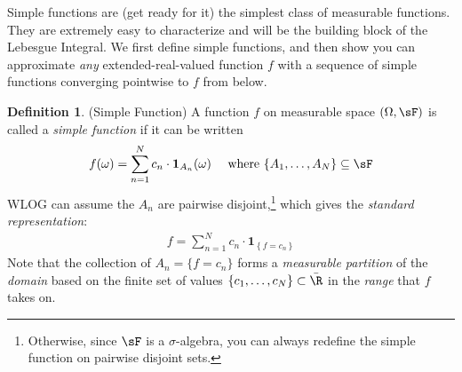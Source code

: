 \documentclass[12pt]{article}
\theoremstyle{plain}
\theoremstyle{definition}
\newtheorem{defn}[thm]{Definition}
\theoremstyle{remark}
\newtheorem*{rmk}{Remark}
\newcommand*{\Chi}{\mbox{\large$\chi$}} %
\newcommand{\one}[1]{\mathbf{1}_{#1}}
\begin{document}
Simple functions are (get ready for it) the simplest class of measurable
functions. They are extremely easy to characterize and will be the
building block of the Lebesgue Integral. We first define simple
functions, and then show you can approximate \emph{any}
extended-real-valued function $f$ with a sequence of simple functions
converging pointwise to $f$ from below.

\begin{defn}(Simple Function)
A function $f$ on measurable space $(\Omega,\sF)$ is called a
\emph{simple function} if it can be written
\begin{equation}
  \label{simplefn}
  f(\omega) = \sum^N_{n=1} c_n \cdot \one{A_n}(\omega)
  \quad
  \text{ where }
  \{A_1, \ldots, A_N\}\subseteq\sF
\end{equation}
WLOG can assume the $A_n$ are pairwise disjoint,\footnote{%
  Otherwise, since $\sF$ is a $\sigma$-algebra, you can always redefine
  the simple function on pairwise disjoint sets.
}
which gives the \emph{standard representation}:
\begin{align*}
  f
  = \sum^N_{n=1} c_n \cdot \one{\left\{f=c_n \right\}}
\end{align*}
Note that the collection of $A_n=\{f=c_n\}$ forms a \emph{measurable
partition} of the \emph{domain} based on the finite set of values
$\{c_1, \ldots, c_N\}\subset \bar{\R}$ in the \emph{range} that $f$
takes on.
\end{defn}
\end{document}

